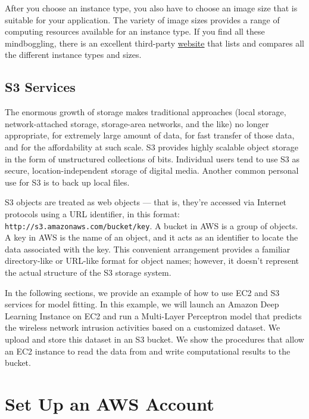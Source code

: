 \documentclass[]{book}
\begin{document}
After you choose an instance type, you also have to choose an image size that is suitable for your application. The variety of image sizes provides a range of computing resources available for an instance type. If you find all these mindboggling, there is an excellent third-party \href{http://ec2instances.info}{website} that lists and compares all the different instance types and sizes.

\hypertarget{s3-services}{%
\section{S3 Services}\label{s3-services}}

The enormous growth of storage makes traditional approaches (local storage, network-attached storage, storage-area networks, and the like) no longer appropriate, for extremely large amount of data, for fast transfer of those data, and for the affordability at such scale. S3 provides highly scalable object storage in the form of unstructured collections of bits. Individual users tend to use S3 as secure, location-independent storage of digital media. Another common personal use for S3 is to back up local files.

S3 objects are treated as web objects --- that is, they're accessed via Internet protocols using a URL identifier, in this format: \texttt{http://s3.amazonaws.com/bucket/key}. A bucket in AWS is a group of objects. A key in AWS is the name of an object, and it acts as an identifier to locate the data associated with the key. This convenient arrangement provides a familiar directory-like or URL-like format for object names; however, it doesn't represent the actual structure of the S3 storage system.

In the following sections, we provide an example of how to use EC2 and S3 services for model fitting. In this example, we will launch an Amazon Deep Learning Instance on EC2 and run a Multi-Layer Perceptron model that predicts the wireless network intrusion activities based on a customized dataset. We upload and store this dataset in an S3 bucket. We show the procedures that allow an EC2 instance to read the data from and write computational results to the bucket.

\hypertarget{set-up-an-aws-account}{%
\chapter{Set Up an AWS Account}\label{set-up-an-aws-account}}
\end{document}
